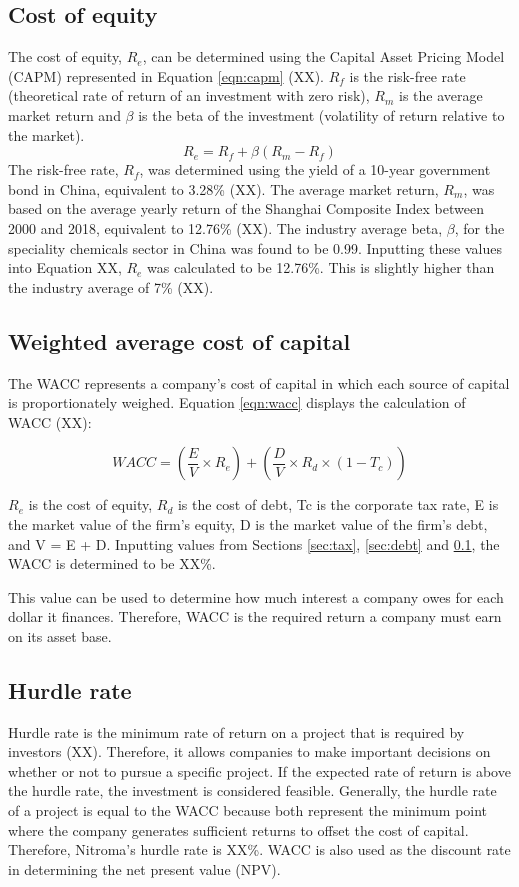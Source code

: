 \subsection{Cost of equity}
\label{sec:equity}
The cost of equity, $R_{e}$, can be determined using the Capital Asset Pricing Model (CAPM) represented in Equation \ref{eqn:capm} (XX). $R_{f}$ is the risk-free rate (theoretical rate of return of an investment with zero risk), $R_{m}$ is the average market return and $\beta$ is the beta of the investment (volatility of return relative to the market).
\begin{equation}
\label{eqn:capm}
    R_{e}=R_{f}+\beta(R_{m}-R_{f})
\end{equation}
The risk-free rate, $R_{f}$, was determined using the yield of a 10-year government bond in China, equivalent to 3.28\% (XX). The average market return, $R_{m}$, was based on the average yearly return of the Shanghai Composite Index between 2000 and 2018, equivalent to 12.76\% (XX). The industry average beta, $\beta$, for the speciality chemicals sector in China was found to be 0.99. Inputting these values into Equation XX, $R_{e}$ was calculated to be 12.76\%. This is slightly higher than the industry average of 7\% (XX).

\subsection{Weighted average cost of capital}
\label{sec:wacc}
The WACC represents a company’s cost of capital in which each source of capital is proportionately weighed. Equation \ref{eqn:wacc} displays the calculation of WACC (XX):

\begin{equation}
\label{eqn:wacc}
    WACC=\left(\frac{E}{V}\times R_{e}\right)+\left(\frac{D}{V}\times R_{d}\times (1-T_{c})\right)
\end{equation}

$R_{e}$ is the cost of equity, $R_{d}$ is the cost of debt, Tc is the corporate tax rate, E is the market value of the firm’s equity, D is the market value of the firm’s debt, and V = E + D. Inputting values from Sections \ref{sec:tax}, \ref{sec:debt} and \ref{sec:equity}, the WACC is determined to be XX\%. 

This value can be used to determine how much interest a company owes for each dollar it finances. Therefore, WACC is the required return a company must earn on its asset base. 

\subsection{Hurdle rate}
Hurdle rate is the minimum rate of return on a project that is required by investors (XX). Therefore, it allows companies to make important decisions on whether or not to pursue a specific project. If the expected rate of return is above the hurdle rate, the investment is considered feasible. Generally, the hurdle rate of a project is equal to the WACC because both represent the minimum point where the company generates sufficient returns to offset the cost of capital. Therefore, Nitroma's hurdle rate is XX\%. WACC is also used as the discount rate in determining the net present value (NPV).